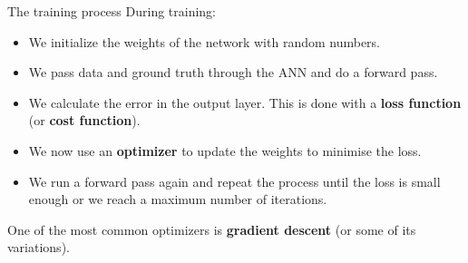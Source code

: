 \documentclass[9pt, aspectratio=169]{beamer}
\begin{document}
\begin{frame}
    {The training process}
    During training:

    \begin{itemize}[<+->]
        \item We initialize the weights of the network with random numbers.
        \item We pass data and ground truth through the ANN and do a forward pass.
        \item We calculate the error in the output layer. This is done with a \textbf{loss function} (or \textbf{cost function}).
        \item We now use an \textbf{optimizer} to update the weights to minimise the loss.
        \item We run a forward pass again and repeat the process until the loss is small enough or we reach a maximum number of iterations.
    \end{itemize}

    \pause
    One of the most common optimizers is \textbf{gradient descent} (or some of its variations).
\end{frame}
\end{document}
